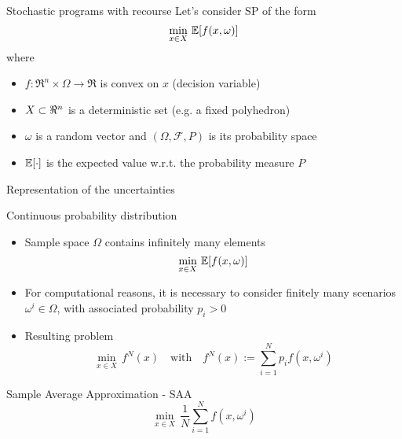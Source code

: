 \begin{frame}{Stochastic programs with recourse} 
Let's consider SP of the form
\[
\min_{x \in X}\, \mathbb{E}[f(x,\omega)] 
\]
where
\begin{itemize}
\item $f:\Re^n\times \Omega \to \Re$ is convex on $x$ (decision variable)
\item $X \subset \Re^n$ is a deterministic set (e.g. a fixed polyhedron)
\item $\omega$ is a random vector and $(\Omega,\mathcal{F},P)$ is its probability space
\item $\mathbb{E}[\cdot]$ is the expected value w.r.t. the probability measure $P$
\end{itemize}
\end{frame}


\begin{frame}{Representation of the uncertainties}
\begin{block}{Continuous probability distribution}
\begin{itemize}
\item Sample space  $\Omega$ contains infinitely many elements
\[
\min_{x \in X}\, \mathbb{E}[f(x,\omega)]
\]

\item  For computational reasons, it is necessary to  consider finitely many scenarios $\omega^i \in \Omega$, with associated probability $p_i>0$
\pula

\item Resulting problem
\[ 
\min_{x \in X}\, f^N(x)\quad \mbox{with}\quad f^N(x):=\sum_{i=1}^{N}p_if(x,\omega^i)
\]
\end{itemize}
\end{block}
\begin{block}{Sample Average Approximation - SAA}
\[
\min_{x \in X}\, \frac{1}{N}\sum_{i=1}^{N}f(x,\omega^i)
\]
\end{block}
 \end{frame}
 
 
 
